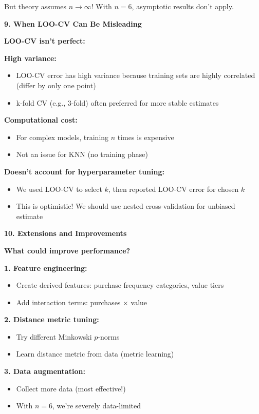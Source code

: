 \documentclass[12pt]{article}
\begin{document}
\begin{explanation}
But theory assumes \(n \to \infty\)! With \(n=6\), asymptotic results don't apply.

\textbf{9. When LOO-CV Can Be Misleading}

\textbf{LOO-CV isn't perfect:}

\textbf{High variance:}
\begin{itemize}
    \item LOO-CV error has high variance because training sets are highly correlated (differ by only one point)
    \item k-fold CV (e.g., 3-fold) often preferred for more stable estimates
\end{itemize}

\textbf{Computational cost:}
\begin{itemize}
    \item For complex models, training \(n\) times is expensive
    \item Not an issue for KNN (no training phase)
\end{itemize}

\textbf{Doesn't account for hyperparameter tuning:}
\begin{itemize}
    \item We used LOO-CV to select \(k\), then reported LOO-CV error for chosen \(k\)
    \item This is optimistic! We should use nested cross-validation for unbiased estimate
\end{itemize}

\textbf{10. Extensions and Improvements}

\textbf{What could improve performance?}

\textbf{1. Feature engineering:}
\begin{itemize}
    \item Create derived features: purchase frequency categories, value tiers
    \item Add interaction terms: purchases × value
\end{itemize}

\textbf{2. Distance metric tuning:}
\begin{itemize}
    \item Try different Minkowski \(p\)-norms
    \item Learn distance metric from data (metric learning)
\end{itemize}

\textbf{3. Data augmentation:}
\begin{itemize}
    \item Collect more data (most effective!)
    \item With \(n=6\), we're severely data-limited
\end{itemize}


\end{explanation}
\end{document}

